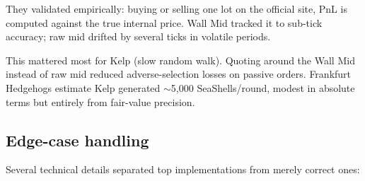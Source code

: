 They validated empirically: buying or selling one lot on the
official site, PnL is computed against the true internal price.
Wall Mid tracked it to sub-tick accuracy; raw mid drifted by
several ticks in volatile periods.

This mattered most for Kelp (slow random walk).  Quoting around
the Wall Mid instead of raw mid reduced adverse-selection losses
on passive orders.  Frankfurt Hedgehogs estimate Kelp generated
$\sim$5{,}000 SeaShells/round, modest in absolute terms but
entirely from fair-value precision.

\subsection{Edge-case handling}
\label{sec:edge_cases}

Several technical details separated top implementations from
merely correct ones:

